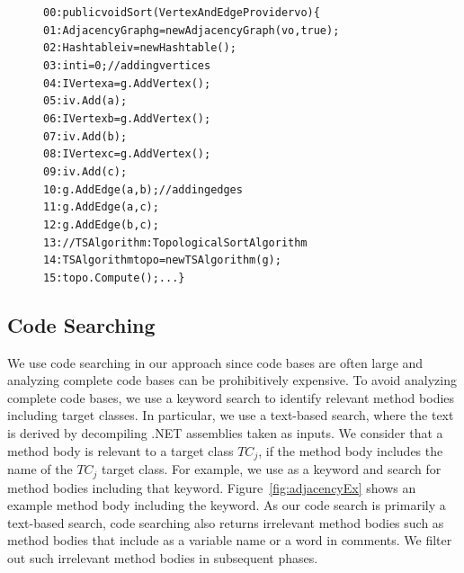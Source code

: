 \begin{figure}[t]
\begin{CodeOut}
\begin{alltt}
00:public void Sort(VertexAndEdgeProvider vo) \{
01:\hspace*{0.1in}AdjacencyGraph g = new AdjacencyGraph(vo, true);
02:\hspace*{0.1in}Hashtable iv = new Hashtable();			
03:\hspace*{0.1in}int i = 0;  //adding vertices
04:\hspace*{0.1in}IVertex a = g.AddVertex();
05:\hspace*{0.1in}iv.Add(a);
06:\hspace*{0.1in}IVertex b = g.AddVertex();
07:\hspace*{0.1in}iv.Add(b);
08:\hspace*{0.1in}IVertex c = g.AddVertex();
09:\hspace*{0.1in}iv.Add(c);
10:\hspace*{0.1in}g.AddEdge(a,b);	//adding edges
11:\hspace*{0.1in}g.AddEdge(a,c);
12:\hspace*{0.1in}g.AddEdge(b,c);
13:\hspace*{0.1in}//TSAlgorithm: TopologicalSortAlgorithm
14:\hspace*{0.1in}TSAlgorithm topo = new TSAlgorithm(g);
15:\hspace*{0.1in}topo.Compute(); ... \}
\end{alltt}
\end{CodeOut}\vspace*{-3ex}
\vspace*{-3ex}
\end{figure}

\subsection{Code Searching} 

We use code searching in our approach since code bases are often large and analyzing complete code bases can be prohibitively expensive. To avoid analyzing complete code bases, we use a keyword search to identify relevant method bodies including target classes. In particular, we use a text-based search, where the text is derived by decompiling .NET assemblies taken as inputs. We consider that a method body is relevant to a target class $TC_j$, if the method body includes the name of the $TC_j$ target class. For example, we use  as a keyword and search for method bodies including that keyword. Figure~\ref{fig:adjacencyEx} shows an example method body including the  keyword. As our code search is primarily a text-based search, code searching also returns irrelevant method bodies such as method bodies that include  as a variable name or a word in comments. We filter out such irrelevant method bodies in subsequent phases. 

